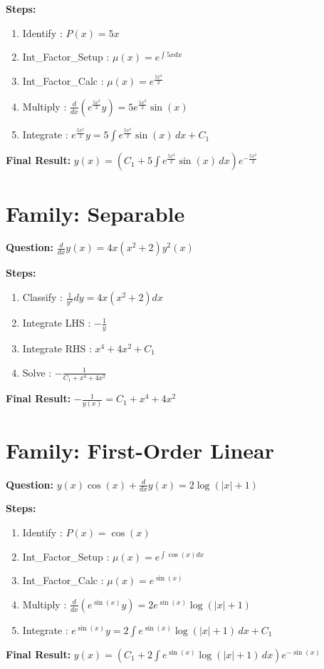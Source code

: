 \documentclass{article}
\begin{document}
\textbf{Steps:}
\begin{enumerate}
\item Identify :  $P(x) = 5 x$
\item Int_Factor_Setup :  $\mu(x) = e^{\int 5 x dx}$
\item Int_Factor_Calc :  $\mu(x) = e^{\frac{5 x^{2}}{2}}$
\item Multiply :  $\frac{d}{dx}(e^{\frac{5 x^{2}}{2}}y) = 5 e^{\frac{5 x^{2}}{2}} \sin{\left(x \right)}$
\item Integrate :  $e^{\frac{5 x^{2}}{2}}y = 5 \int e^{\frac{5 x^{2}}{2}} \sin{\left(x \right)}\, dx + C_1$
\end{enumerate}
\textbf{Final Result:} $y{\left(x \right)} = \left(C_{1} + 5 \int e^{\frac{5 x^{2}}{2}} \sin{\left(x \right)}\, dx\right) e^{- \frac{5 x^{2}}{2}}$

\section*{Family: Separable}
\textbf{Question:} $\frac{d}{d x} y{\left(x \right)} = 4 x \left(x^{2} + 2\right) y^{2}{\left(x \right)}$

\textbf{Steps:}
\begin{enumerate}
\item Classify :  $\frac{1}{y^{2}} dy = 4 x \left(x^{2} + 2\right) dx$
\item Integrate LHS :  $- \frac{1}{y}$
\item Integrate RHS :  $x^{4} + 4 x^{2} + C_1$
\item Solve :  $- \frac{1}{C_{1} + x^{4} + 4 x^{2}}$
\end{enumerate}
\textbf{Final Result:} $- \frac{1}{y{\left(x \right)}} = C_{1} + x^{4} + 4 x^{2}$

\section*{Family: First-Order Linear}
\textbf{Question:} $y{\left(x \right)} \cos{\left(x \right)} + \frac{d}{d x} y{\left(x \right)} = 2 \log{\left(\left|{x}\right| + 1 \right)}$

\textbf{Steps:}
\begin{enumerate}
\item Identify :  $P(x) = \cos{\left(x \right)}$
\item Int_Factor_Setup :  $\mu(x) = e^{\int \cos{\left(x \right)} dx}$
\item Int_Factor_Calc :  $\mu(x) = e^{\sin{\left(x \right)}}$
\item Multiply :  $\frac{d}{dx}(e^{\sin{\left(x \right)}}y) = 2 e^{\sin{\left(x \right)}} \log{\left(\left|{x}\right| + 1 \right)}$
\item Integrate :  $e^{\sin{\left(x \right)}}y = 2 \int e^{\sin{\left(x \right)}} \log{\left(\left|{x}\right| + 1 \right)}\, dx + C_1$
\end{enumerate}
\textbf{Final Result:} $y{\left(x \right)} = \left(C_{1} + 2 \int e^{\sin{\left(x \right)}} \log{\left(\left|{x}\right| + 1 \right)}\, dx\right) e^{- \sin{\left(x \right)}}$
\end{document}
